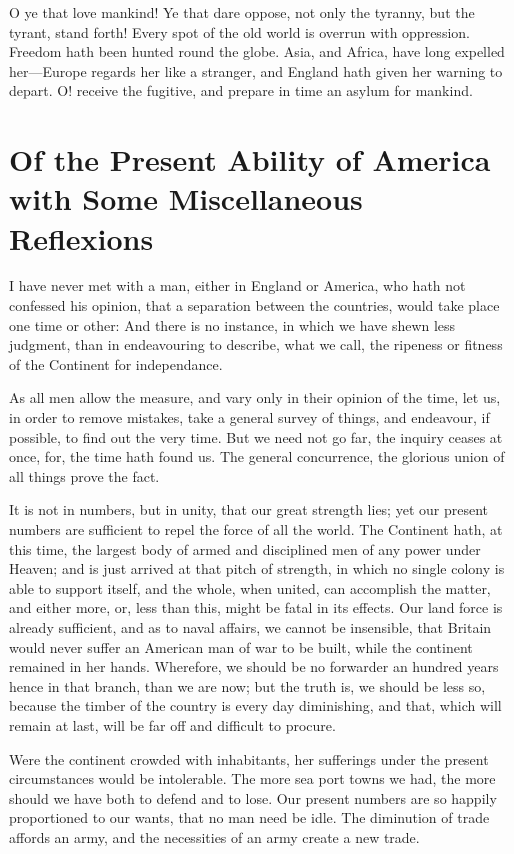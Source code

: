 \documentclass[12pt,oneside]{memoir}
\begin{document}
O ye that love mankind! Ye that dare oppose, not only the tyranny,
but the tyrant, stand forth! Every spot of the old world is overrun
with oppression. Freedom hath been hunted round the globe. Asia, and
Africa, have long expelled her---Europe regards her like a stranger,
and England hath given her warning to depart. O! receive the
fugitive, and prepare in time an asylum for mankind.


\section*{Of the Present Ability of America with Some Miscellaneous Reflexions}

I have never met with a man, either in England or America, who hath
not confessed his opinion, that a separation between the countries,
would take place one time or other: And there is no instance, in
which we have shewn less judgment, than in endeavouring to describe,
what we call, the ripeness or fitness of the Continent for
independance.

As all men allow the measure, and vary only in their opinion of the
time, let us, in order to remove mistakes, take a general survey of
things, and endeavour, if possible, to find out the very time. But
we need not go far, the inquiry ceases at once, for, the time hath
found us. The general concurrence, the glorious union of all things
prove the fact.

It is not in numbers, but in unity, that our great strength lies;
yet our present numbers are sufficient to repel the force of all the
world. The Continent hath, at this time, the largest body of armed
and disciplined men of any power under Heaven; and is just arrived
at that pitch of strength, in which no single colony is able to
support itself, and the whole, when united, can accomplish the
matter, and either more, or, less than this, might be fatal in its
effects. Our land force is already sufficient, and as to naval
affairs, we cannot be insensible, that Britain would never suffer an
American man of war to be built, while the continent remained in her
hands. Wherefore, we should be no forwarder an hundred years hence
in that branch, than we are now; but the truth is, we should be less
so, because the timber of the country is every day diminishing, and
that, which will remain at last, will be far off and difficult to
procure.

Were the continent crowded with inhabitants, her sufferings under
the present circumstances would be intolerable. The more sea port
towns we had, the more should we have both to defend and to lose.
Our present numbers are so happily proportioned to our wants, that
no man need be idle. The diminution of trade affords an army, and
the necessities of an army create a new trade.
\end{document}
